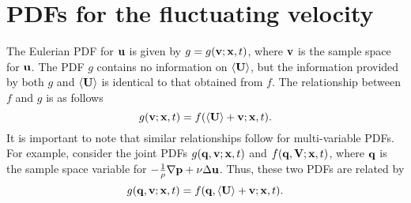 \documentclass[oneside,a4paper,11pt]{report}
\begin{document}
\section{PDFs for the fluctuating velocity}

The Eulerian PDF  for $\mathbf{u}$ is given by $g = g(\mathbf{v}; \mathbf{x},t)$, where $\mathbf{v}$ is the sample space for $\mathbf{u}$. The PDF $g$ contains no information on $\langle \mathbf{U} \rangle$, but the information provided by both $g$ and $\langle \mathbf{U} \rangle$ is identical to that obtained from $f$. The relationship between $f$ and $g$ is as follows
\begin{equation}
\label{eul_g_f}
g(\mathbf{v}; \mathbf{x},t) = f(\langle \mathbf{U} \rangle + \mathbf{v}; \mathbf{x},t).
\end{equation}
It is important to note that similar relationships follow for multi-variable PDFs. For example, consider the joint PDFs $g(\mathbf{q},\mathbf{v}; \mathbf{x}, t)$ and $f(\mathbf{q}, \mathbf{V}; \mathbf{x}, t)$, where $\mathbf{q}$ is the sample space variable for $- \frac{1}{\rho} \nabla \mathbf{p} +  \nu \Delta \mathbf{u}$. Thus, these two PDFs are related by 
\begin{equation}
\label{eul_g_f_joint}
g(\mathbf{q}, \mathbf{v}; \mathbf{x},t) = f(\mathbf{q}, \langle \mathbf{U} \rangle + \mathbf{v}; \mathbf{x},t).
\end{equation}
\end{document}
